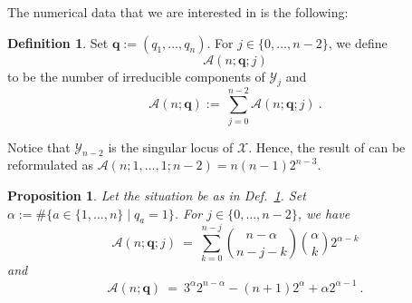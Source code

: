\documentclass[letter,11pt]{amsart}
\newcommand{\q}{\boldsymbol{q}}
\theoremstyle{theorem}
\newtheorem{prop}[Thm]{Proposition}
\theoremstyle{definition}
\newtheorem{defi}[Thm]{Definition} %
\numberwithin{equation}{section}
\begin{document}
The numerical data that we are interested in is the following:
 
\begin{defi}
	\label{Def:cA}
	Set $ \q := (q_1, \ldots, q_n) $. 
	For $ j \in \{ 0, \ldots, n - 2 \} $,
	we define
	\[  
		\mathcal{A} (n;\q; j) 
	\] 
	to be the number of irreducible components of $ \mathcal{Y}_j $
	and
	\[
		\mathcal{A} (n;\q) := \ \sum_{j=0}^{n-2} \mathcal{A} (n;\q; j) 
		\ . 
	\]
\end{defi}

Notice that $ \mathcal{Y}_{n-2} $ is the singular locus of $ \mathcal{X} $. 
Hence, the result of \cite{BFMS23} can be reformulated as $ \mathcal{A} (n;1, \ldots, 1; n-2) = n (n-1) 2^{n-3} $.


\begin{prop}
	\label{Prop:cA}
	Let the situation be as in Def.~\ref{Def:cA}.
	Set $ \alpha := \# \{ a \in \{ 1, \ldots, n \} \mid q_a = 1 \} $.
	For $ j \in \{ 0, \ldots, n - 2 \} $,
	we have 
	\[
		\mathcal{A} (n;\q; j) 
		\ = \ 
		\sum_{k=0}^{n-j} 
		\binom{n-\alpha}{n-j-k} \binom{\alpha}{k} 2^{\alpha - k}
	\]
	and
	\[
	\mathcal{A} (n;\q) 
	\ = \ 
	3^\alpha 2^{n-\alpha}  
	- ( n + 1) 2^{\alpha} 
	+ \alpha 2^{\alpha - 1}
	\ .
	\]
\end{prop}
\end{document}
